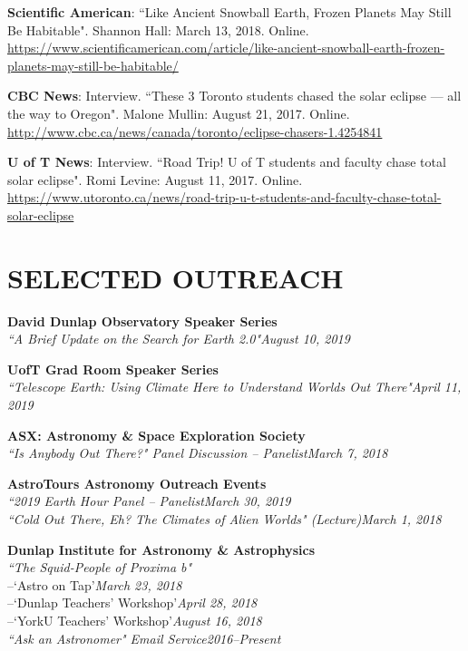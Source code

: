 \documentclass[10pt]{res} %
\begin{document}
\begin{resume}
\textbf{Scientific American}: ``Like Ancient Snowball Earth, Frozen Planets May Still Be Habitable". Shannon Hall: March 13, 2018. Online. \url{https://www.scientificamerican.com/article/like-ancient-snowball-earth-frozen-planets-may-still-be-habitable/}


\textbf{CBC News}: Interview. ``These 3 Toronto students chased the solar eclipse — all the way to Oregon". Malone Mullin: August 21, 2017. Online. \url{http://www.cbc.ca/news/canada/toronto/eclipse-chasers-1.4254841}


\textbf{U of T News}: Interview. ``Road Trip! U of T students and faculty chase total solar eclipse". Romi Levine: August 11, 2017. Online. \url{https://www.utoronto.ca/news/road-trip-u-t-students-and-faculty-chase-total-solar-eclipse}


\section{SELECTED OUTREACH}

\textbf{David Dunlap Observatory Speaker Series}\\
{\sl ``A Brief Update on the Search for Earth 2.0"}\hfill{\sl August 10, 2019}

\textbf{UofT Grad Room Speaker Series}\\
{\sl ``Telescope Earth: Using Climate Here to Understand Worlds Out There"}\hfill{\sl April 11, 2019}

\textbf{ASX: Astronomy \& Space Exploration Society}\\
{\sl ``Is Anybody Out There?" Panel Discussion -- Panelist}\hfill{\sl March 7, 2018}

\textbf{AstroTours Astronomy Outreach Events}\\
{\sl ``2019 Earth Hour Panel -- Panelist}\hfill{\sl March 30, 2019}\\
{\sl ``Cold Out There, Eh? The Climates of Alien Worlds" (Lecture)}\hfill{\sl March 1, 2018}%

\textbf{Dunlap Institute for Astronomy \& Astrophysics}\\
{\sl ``The Squid-People of Proxima b"}\\
 {--\hspace{10mm}`Astro on Tap'}\hfill{\sl March 23, 2018}\\
 {--\hspace{10mm}`Dunlap Teachers' Workshop'}\hfill{\sl April 28, 2018}\\
 {--\hspace{10mm}`YorkU Teachers' Workshop'}\hfill{\sl August 16, 2018}\\
{\sl ``Ask an Astronomer" Email Service}\hfill{\sl 2016--Present}%


\end{resume}
\end{document}
